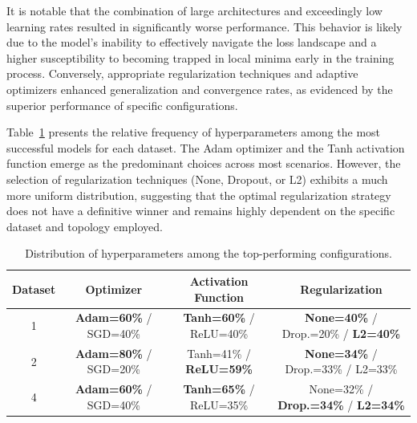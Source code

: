 \documentclass{article}
\begin{document}
It is notable that the combination of large architectures and exceedingly low learning rates resulted in significantly worse performance. This behavior is likely due to the model's inability to effectively navigate the loss landscape and a higher susceptibility to becoming trapped in local minima early in the training process. Conversely, appropriate regularization techniques and adaptive optimizers enhanced generalization and convergence rates, as evidenced by the superior performance of specific configurations.

Table~\ref{tab:param_summary} presents the relative frequency of hyperparameters among the most successful models for each dataset. The Adam optimizer and the Tanh activation function emerge as the predominant choices across most scenarios. However, the selection of regularization techniques (None, Dropout, or L2) exhibits a much more uniform distribution, suggesting that the optimal regularization strategy does not have a definitive winner and remains highly dependent on the specific dataset and topology employed.

\begin{table}[H]
    \centering
    \begin{tabular}{c c c c}
        \toprule
        \textbf{Dataset} & \textbf{Optimizer} & \textbf{Activation Function} & \textbf{Regularization} \\
        \midrule
        1 & \textbf{Adam=60\%} / SGD=40\% & \textbf{Tanh=60\%} / ReLU=40\% & \textbf{None=40\%} / Drop.=20\% / \textbf{L2=40\%} \\
        2 & \textbf{Adam=80\%} / SGD=20\% & Tanh=41\% / \textbf{ReLU=59\%} & \textbf{None=34\%} / Drop.=33\% / L2=33\% \\
        4 & \textbf{Adam=60\%} / SGD=40\% & \textbf{Tanh=65\%} / ReLU=35\% & None=32\% / \textbf{Drop.=34\%} / \textbf{L2=34\%} \\
        \bottomrule
    \end{tabular}
    \caption{Distribution of hyperparameters among the top-performing configurations.}
    \label{tab:param_summary}
\end{table}
\end{document}
